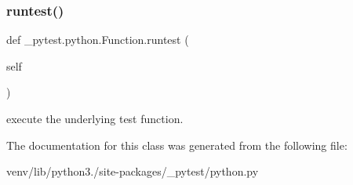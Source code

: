 \subsubsection{\texorpdfstring{runtest()}{runtest()}}
{\footnotesize\ttfamily def \+\_\+pytest.\+python.\+Function.\+runtest (\begin{DoxyParamCaption}\item[{}]{self }\end{DoxyParamCaption})}

\begin{DoxyVerb}execute the underlying test function. \end{DoxyVerb}
 

The documentation for this class was generated from the following file\+:\begin{DoxyCompactItemize}
\item 
venv/lib/python3./site-\/packages/\+\_\+pytest/python.\+py\end{DoxyCompactItemize}
